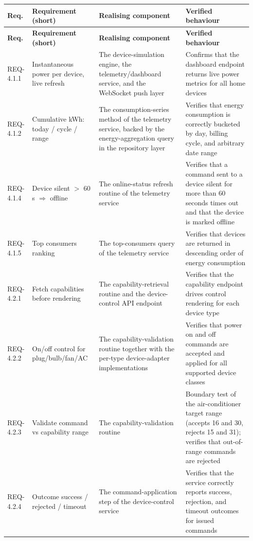 \begin{longtable}{@{}L{1.7cm} L{4.3cm} L{4.4cm} L{3.4cm}@{}}
\toprule
\textbf{Req.} & \textbf{Requirement (short)} & \textbf{Realising component} & \textbf{Verified behaviour} \\
\midrule
\endfirsthead
\toprule
\textbf{Req.} & \textbf{Requirement (short)} & \textbf{Realising component} & \textbf{Verified behaviour} \\
\midrule
\endhead
\bottomrule
\endfoot
REQ-4.1.1 & Instantaneous power per device, live refresh & The device-simulation engine, the telemetry/dashboard service, and the WebSocket push layer & Confirms that the dashboard endpoint returns live power metrics for all home devices \\
REQ-4.1.2 & Cumulative kWh: today / cycle / range & The consumption-series method of the telemetry service, backed by the energy-aggregation query in the repository layer & Verifies that energy consumption is correctly bucketed by day, billing cycle, and arbitrary date range \\
REQ-4.1.4 & Device silent $>$ 60\,s $\Rightarrow$ offline & The online-status refresh routine of the telemetry service & Verifies that a command sent to a device silent for more than 60 seconds times out and that the device is marked offline \\
REQ-4.1.5 & Top consumers ranking & The top-consumers query of the telemetry service & Verifies that devices are returned in descending order of energy consumption \\
REQ-4.2.1 & Fetch capabilities before rendering & The capability-retrieval routine and the device-control API endpoint & Verifies that the capability endpoint drives control rendering for each device type \\
REQ-4.2.2 & On/off control for plug/bulb/fan/AC & The capability-validation routine together with the per-type device-adapter implementations & Verifies that power on and off commands are accepted and applied for all supported device classes \\
REQ-4.2.3 & Validate command vs capability range & The capability-validation routine & Boundary test of the air-conditioner target range (accepts 16 and 30, rejects 15 and 31); verifies that out-of-range commands are rejected \\
REQ-4.2.4 & Outcome success / rejected / timeout & The command-application step of the device-control service & Verifies that the service correctly reports success, rejection, and timeout outcomes for issued commands \\

\end{longtable}
